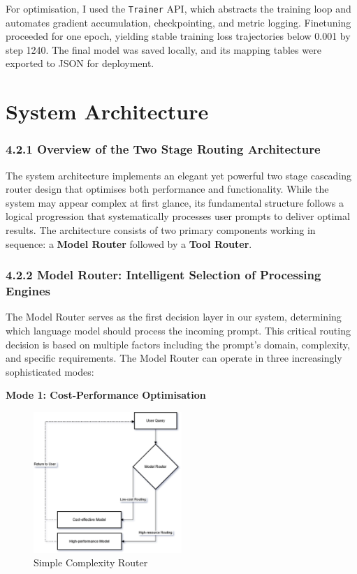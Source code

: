 For optimisation, I used the \texttt{Trainer} API, which abstracts the training loop and automates gradient accumulation, checkpointing, and metric logging. Finetuning proceeded for one epoch, yielding stable training loss trajectories below 0.001 by step 1240. The final model was saved locally, and its mapping tables were exported to JSON for deployment.


\section{System Architecture}
\subsubsection{4.2.1 Overview of the Two Stage Routing Architecture}

The system architecture implements an elegant yet powerful two stage cascading router design that optimises both performance and functionality. While the system may appear complex at first glance, its fundamental structure follows a logical progression that systematically processes user prompts to deliver optimal results. The architecture consists of two primary components working in sequence: a \textbf{Model Router} followed by a \textbf{Tool Router}.

\subsubsection{4.2.2 Model Router: Intelligent Selection of Processing Engines}

The Model Router serves as the first decision layer in our system, determining which language model should process the incoming prompt. This critical routing decision is based on multiple factors including the prompt's domain, complexity, and specific requirements. The Model Router can operate in three increasingly sophisticated modes:

\textbf{Mode 1: Cost-Performance Optimisation}  


\begin{figure}[H]
    \centering
    \includegraphics[width=0.5\textwidth]{figures/model-compx-router.drawio.png}
    \caption{Simple Complexity Router}
    \label{fig:simple_complexity_router}
\end{figure}


